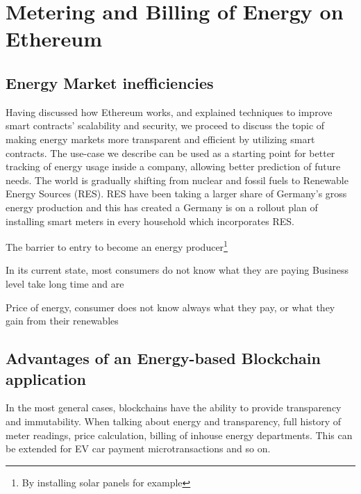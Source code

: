\chapter{Metering and Billing of Energy on Ethereum}\label{ch:implementation}

\section{Energy Market inefficiencies}

Having discussed how Ethereum works, and explained techniques to improve smart contracts' scalability and security, we proceed to discuss the topic of making energy markets more transparent and efficient by utilizing smart contracts. The use-case we describe can be used as a starting point for better tracking of energy usage inside a company, allowing better prediction of future needs.  
The world is gradually shifting from nuclear and fossil fuels to Renewable Energy Sources (RES). RES have been taking a larger share of Germany's gross energy production and this has created a 
Germany is on a rollout plan of installing smart meters in every household which incorporates RES.  

The barrier to entry to become an energy producer\footnote{By installing solar panels for example} 

In its current state, most consumers do not know what they are paying Business level take long time and are 

Price of energy, consumer does not know always what they pay, or what they gain from their renewables
 
\section{Advantages of an Energy-based Blockchain application}
In the most general cases, blockchains have the ability to provide transparency and immutability. When talking about energy and transparency, full history of meter readings, price calculation, billing of inhouse energy departments. This can be extended for EV car payment microtransactions and so on.


